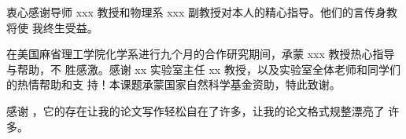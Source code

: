 
\begin{acknowledgement}
  衷心感谢导师 xxx 教授和物理系 xxx 副教授对本人的精心指导。他们的言传身教将使
  我终生受益。

  在美国麻省理工学院化学系进行九个月的合作研究期间，承蒙 xxx 教授热心指导与帮助，不
  胜感激。感谢 xx 实验室主任 xx 教授，以及实验室全体老师和同学们的热情帮助和支
  持！本课题承蒙国家自然科学基金资助，特此致谢。

  感谢 \thuthesis，它的存在让我的论文写作轻松自在了许多，让我的论文格式规整漂亮了
  许多。
\end{acknowledgement}
